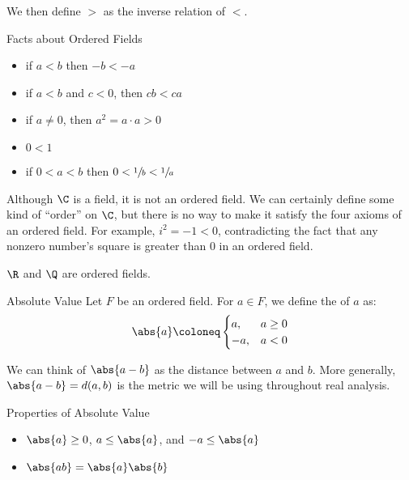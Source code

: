 We then define $>$ as the inverse relation of $<$.

\begin{thmbox}{Facts about Ordered Fields}{}
    \begin{itemize}[noitemsep]
        \item if $a < b$ then $-b < -a$
        \item if $a < b$ and $c < 0$, then $cb < ca$
        \item if $a \neq 0$, then $a^2 = a \cdot a > 0$
        \item $0 < 1$
        \item if $0<a<b$ then $0 < \sfrac{1}{b} < \sfrac{1}{a}$
    \end{itemize}
\end{thmbox}

Although $\C$ is a field, it is not an ordered field. We can certainly define some kind of ``order'' on $\C$, but there is no way to make it satisfy the four axioms of an ordered field. For example, $i^2 = -1 < 0$, contradicting the fact that any nonzero number's square is greater than $0$ in an ordered field.

$\R$ and $\Q$ are ordered fields.

\begin{dfnbox}{Absolute Value}{}
    Let $F$ be an ordered field. For $a \in F$, we define the  of $a$ as:
    \[ \abs{a} \coloneq \begin{cases} a, & a \geq 0 \\ -a, & a < 0 \end{cases} \]
\end{dfnbox}

We can think of $\abs{a-b}$ as the distance between $a$ and $b$. More generally, $\abs{a-b} = d(a,b)$ is the metric we will be using throughout real analysis.

\begin{thmbox}{Properties of Absolute Value}{}
    \begin{itemize}
        \item $\abs{a} \geq 0$, $a \leq \abs{a}$, and $-a \leq \abs{a}$
        \item $\abs{ab} = \abs{a}\abs{b}$
    \end{itemize}
\end{thmbox}


